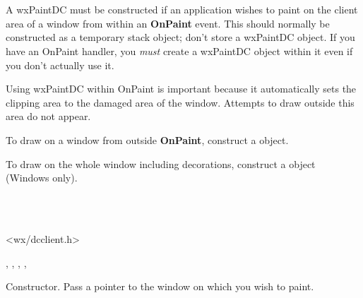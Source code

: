 \section{}\label{wxpaintdc}

A wxPaintDC must be constructed if an application wishes to paint on the
client area of a window from within an {\bf OnPaint} event.
This should normally be constructed as a temporary stack object; don't store
a wxPaintDC object. If you have an OnPaint handler, you {\it must} create a wxPaintDC
object within it even if you don't actually use it.

Using wxPaintDC within OnPaint is important because it automatically
sets the clipping area to the damaged area of the window. Attempts to draw
outside this area do not appear.

To draw on a window from outside {\bf OnPaint}, construct a  object.

To draw on the whole window including decorations, construct a  object
(Windows only).


\\
\\


<wx/dcclient.h>




, , ,\rtfsp
{}, 


\label{wxpaintdcctor}


Constructor. Pass a pointer to the window on which you wish to paint.



